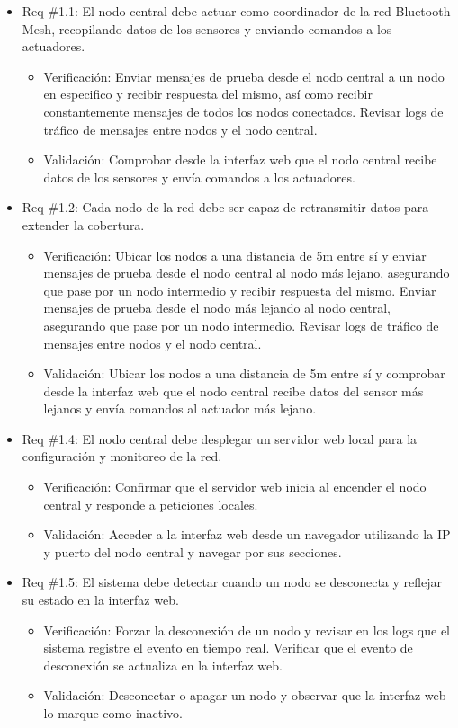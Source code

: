 \documentclass[
11pt, %
]{charter}
\begin{document}
\begin{itemize} 
\item Req \#1.1: El nodo central debe actuar como coordinador de la red Bluetooth Mesh, recopilando datos de los sensores y enviando comandos a los actuadores.
\begin{itemize}
	\item Verificación: Enviar mensajes de prueba desde el nodo central a un nodo en especifico y recibir respuesta del mismo, así como recibir constantemente mensajes de todos los nodos conectados. Revisar logs de tráfico de mensajes entre nodos y el nodo central.
	\item Validación: Comprobar desde la interfaz web que el nodo central recibe datos de los sensores y envía comandos a los actuadores.
\end{itemize}


\item Req \#1.2: Cada nodo de la red debe ser capaz de retransmitir datos para extender la cobertura.
\begin{itemize}
	\item Verificación: Ubicar los nodos a una distancia de 5m entre sí y enviar mensajes de prueba desde el nodo central al nodo más lejano, asegurando que pase por un nodo intermedio y recibir respuesta del mismo. Enviar mensajes de prueba desde el nodo más lejando al nodo central, asegurando que pase por un nodo intermedio. Revisar logs de tráfico de mensajes entre nodos y el nodo central.
	\item Validación:  Ubicar los nodos a una distancia de 5m entre sí y comprobar desde la interfaz web que el nodo central recibe datos del sensor más lejanos y envía comandos al actuador más lejano.
\end{itemize}


\item Req \#1.4: El nodo central debe desplegar un servidor web local para la configuración y monitoreo de la red.
\begin{itemize}
	\item Verificación: Confirmar que el servidor web inicia al encender el nodo central y responde a peticiones locales.
	\item Validación: Acceder a la interfaz web desde un navegador utilizando la IP y puerto del nodo central y navegar por sus secciones.
\end{itemize}


\item Req \#1.5: El sistema debe detectar cuando un nodo se desconecta y reflejar su estado en la interfaz web.
\begin{itemize}
	\item Verificación: Forzar la desconexión de un nodo y revisar en los logs que el sistema registre el evento en tiempo real. Verificar que el evento de desconexión se actualiza en la interfaz web.
	\item Validación: Desconectar o apagar un nodo y observar que la interfaz web lo marque como inactivo.
\end{itemize}



\end{itemize}
\end{document}
